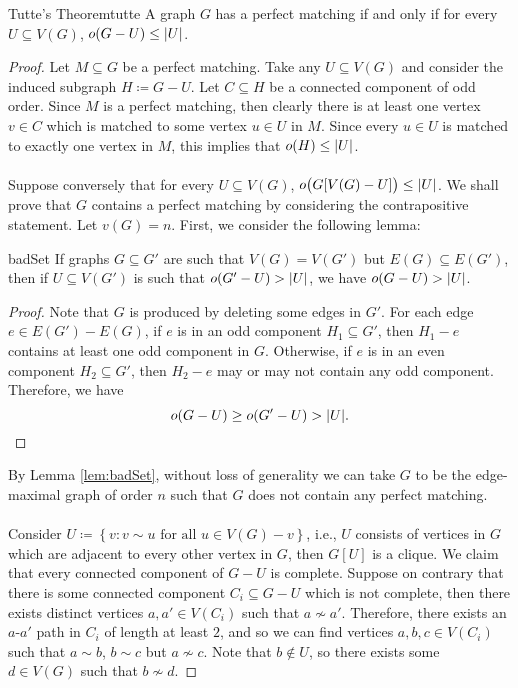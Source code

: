 \documentclass[math, code]{amznotes}
\theoremstyle{remark}
\begin{document}
\begin{thmbox}{Tutte's Theorem}{tutte}
    A graph $G$ has a perfect matching if and only if for every $U \subseteq V(G)$, $o(G - U) \leq {\left\lvert {U} \right\rvert}$.
    \tcblower
    \begin{proof}
        Let $M \subseteq G$ be a perfect matching. Take any $U \subseteq V(G)$ and consider the induced subgraph $H \coloneqq G - U$. Let $C \subseteq H$ be a connected component of odd order. Since $M$ is a perfect matching, then clearly there is at least one vertex $v \in C$ which is matched to some vertex $u \in U$ in $M$. Since every $u \in U$ is matched to exactly one vertex in $M$, this implies that $o(H) \leq {\left\lvert {U} \right\rvert}$.
        \\\\
        Suppose conversely that for every $U \subseteq V(G)$, $o\bigl(G[V(G) - U]\bigr) \leq {\left\lvert {U} \right\rvert}$. We shall prove that $G$ contains a perfect matching by considering the contrapositive statement. Let $v(G) = n$. First, we consider the following lemma:
        \begin{lembox}{}{badSet}
            If graphs $G \subseteq G'$ are such that $V(G) = V(G')$ but $E(G) \subseteq E(G')$, then if $U \subseteq V(G')$ is such that $o(G' - U) > {\left\lvert {U} \right\rvert}$, we have $o(G - U) > {\left\lvert {U} \right\rvert}$.
            \tcblower
            \begin{proof}
                Note that $G$ is produced by deleting some edges in $G'$. For each edge $e \in E(G') - E(G)$, if $e$ is in an odd component $H_1 \subseteq G'$, then $H_1 - e$ contains at least one odd component in $G$. Otherwise, if $e$ is in an even component $H_2 \subseteq G'$, then $H_2 - e$ may or may not contain any odd component. Therefore, we have
                \begin{equation*}
                    o(G - U) \geq o(G' - U) > {\left\lvert {U} \right\rvert}.
                \end{equation*}  
            \end{proof}
        \end{lembox}
        By Lemma \ref{lem:badSet}, without loss of generality we can take $G$ to be the edge-maximal graph of order $n$ such that $G$ does not contain any perfect matching. 
        \\\\
        Consider $U \coloneqq \left\{v \colon v \sim u \textrm{ for all } u \in V(G) - v\right\}$, i.e., $U$ consists of vertices in $G$ which are adjacent to every other vertex in $G$, then $G[U]$ is a clique. We claim that every connected component of $G - U$ is complete. Suppose on contrary that there is some connected component $C_i \subseteq G - U$ which is not complete, then there exists distinct vertices $a, a' \in V(C_i)$ such that $a \not\sim a'$. Therefore, there exists an $a$-$a'$ path in $C_i$ of length at least $2$, and so we can find vertices $a, b, c \in V(C_i)$ such that $a \sim b$, $b \sim c$ but $a \not\sim c$. Note that $b \notin U$, so there exists some $d \in V(G)$ such that $b \not\sim d$.

\end{proof}
\end{thmbox}
\end{document}
